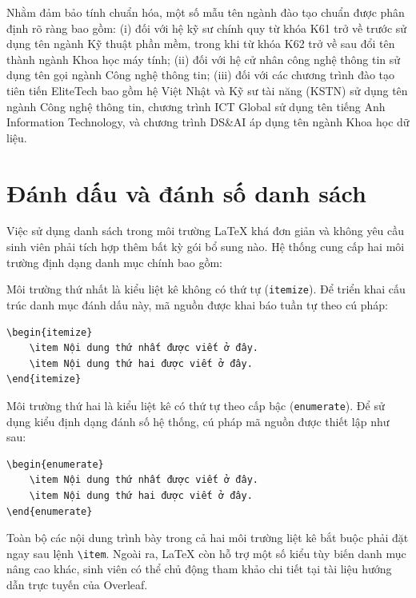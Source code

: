 \documentclass[../DoAn.tex]{subfiles}
\begin{document}
Nhằm đảm bảo tính chuẩn hóa, một số mẫu tên ngành đào tạo chuẩn được phân định rõ ràng bao gồm: (i) đối với hệ kỹ sư chính quy từ khóa K61 trở về trước sử dụng tên ngành Kỹ thuật phần mềm, trong khi từ khóa K62 trở về sau đổi tên thành ngành Khoa học máy tính; (ii) đối với hệ cử nhân công nghệ thông tin sử dụng tên gọi ngành Công nghệ thông tin; (iii) đối với các chương trình đào tạo tiên tiến EliteTech bao gồm hệ Việt Nhật và Kỹ sư tài năng (KSTN) sử dụng tên ngành Công nghệ thông tin, chương trình ICT Global sử dụng tên tiếng Anh Information Technology, và chương trình DS\&AI áp dụng tên ngành Khoa học dữ liệu.

\section{Đánh dấu và đánh số danh sách}
Việc sử dụng danh sách trong môi trường LaTeX khá đơn giản và không yêu cầu sinh viên phải tích hợp thêm bất kỳ gói bổ sung nào. Hệ thống cung cấp hai môi trường định dạng danh mục chính bao gồm:

Môi trường thứ nhất là kiểu liệt kê không có thứ tự (\texttt{itemize}). Để triển khai cấu trúc danh mục đánh dấu này, mã nguồn được khai báo tuần tự theo cú pháp:
\begin{verbatim}
\begin{itemize}
    \item Nội dung thứ nhất được viết ở đây.
    \item Nội dung thứ hai được viết ở đây.
\end{itemize}
\end{verbatim}

Môi trường thứ hai là kiểu liệt kê có thứ tự theo cấp bậc (\texttt{enumerate}). Để sử dụng kiểu định dạng đánh số hệ thống, cú pháp mã nguồn được thiết lập như sau:
\begin{verbatim}
\begin{enumerate}
    \item Nội dung thứ nhất được viết ở đây.
    \item Nội dung thứ hai được viết ở đây.
\end{enumerate}
\end{verbatim}

Toàn bộ các nội dung trình bày trong cả hai môi trường liệt kê bắt buộc phải đặt ngay sau lệnh \texttt{\textbackslash item}. Ngoài ra, LaTeX còn hỗ trợ một số kiểu tùy biến danh mục nâng cao khác, sinh viên có thể chủ động tham khảo chi tiết tại tài liệu hướng dẫn trực tuyến của Overleaf.
\end{document}
